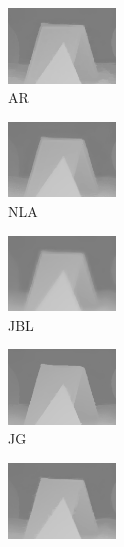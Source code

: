 \documentclass[preprint,10pt,5p,times,twocolumn]{elsarticle}
\begin{document}
\begin{figure}[t]
\begin{center}
\vspace{-0.3cm}
\begin{subfigure}[b]{0.136\linewidth}
    \includegraphics[height = 2cm,width=\linewidth]{cmp_moebius_8X_JG_part.png}
    \caption{AR~\cite{YangJingyu2012}}
    \label{fig:AR}
\end{subfigure}
\begin{subfigure}[b]{0.136\linewidth}
    \includegraphics[height = 2cm,width=\linewidth]{cmp_moebius_8X_NLA_part.png}
    \caption{NLA~\cite{Yang2012}}
    \label{fig:NLA} %
\end{subfigure}
\begin{subfigure}[b]{0.136\linewidth}
    \includegraphics[height = 2cm,width=\linewidth]{cmp_moebius_8X_JBL_part.png}
    \caption{JBL~\cite{Kopf2007}}
    \label{fig:JBL}
\end{subfigure}
\begin{subfigure}[b]{0.136\linewidth}
    \includegraphics[height = 2cm,width=\linewidth]{cmp_moebius_8X_AR_part.png}
    \caption{JG~\cite{Liu2013}}
    \label{fig:JG} %
\end{subfigure}
\begin{subfigure}[b]{0.136\linewidth}
    \includegraphics[height = 2cm,width=\linewidth]{cmp_moebius_8X_ST_part.png}

\end{subfigure}
\end{center}
\end{figure}
\end{document}
